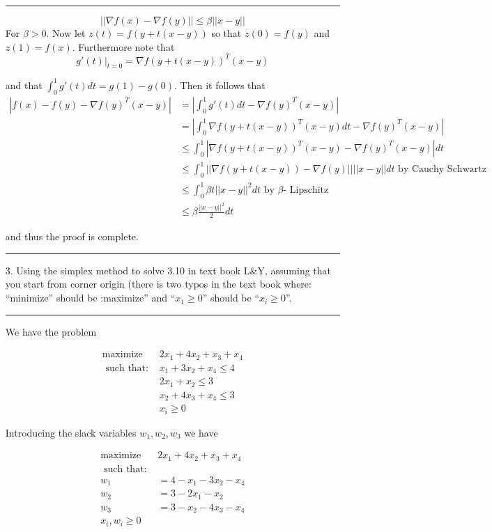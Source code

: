 \documentclass[12pt,letterpaper]{article}
\begin{document}
\begin{enumerate}
\rule{\textwidth}{1pt}
\[
|| \nabla f(x) - \nabla f(y) || \leq \beta ||x - y ||
\]
For $\beta > 0$. Now let $z(t) = f(y + t(x -y))$ so that $z(0) = f(y)$ and $z(1) = f(x)$. Furthermore note that
\[
g'(t)|_{t = 0 } = \nabla f(y + t(x - y))^{T} (x - y)
\]

and that $\int_{0}^{1} g'(t) dt = g(1) - g(0)$. Then it follows that 
\begin{equation*}
\begin{aligned}
|f(x) - f(y) - \nabla f(y)^T (x - y) | &= | \int_{0}^{1} g'(t) dt - \nabla f(y)^T (x -y)|   \\ 
&= | \int_{0}^{1} \nabla f(y + t(x - y))^T (x - y) dt - \nabla f(y)^T (x - y) | \\ 
&\leq \int_{0}^1 | \nabla f(y + t(x - y))^T (x - y) - \nabla f(y)^T (x - y) |dt  \\ 
&\leq \int_{0}^1 || \nabla f(y + t(x - y)) - \nabla f(y) || ||x - y|| dt   \mbox{    by Cauchy Schwartz } \\ 
&\leq \int_{0}^1 \beta t ||x - y||^2 dt   \mbox{    by $\beta$- Lipschitz } \\ 
&\leq  \beta  \frac{||x - y||^2}{2} dt  
\end{aligned}
\end{equation*}

and thus the proof is complete. 

\rule{\textwidth}{1pt}
\item[3.] Using the simplex method to solve 3.10 in text book L\&Y, assuming that you start from corner origin (there is two typos in
the text book where: ``minimize'' should be :maximize'' and ``$x_1\ge 0$'' should be ``$x_i\ge 0$''.


\rule{\textwidth}{1pt}


We have the problem 

\begin{equation*}
\begin{aligned}
\mbox{maximize } &2x_1 + 4x_2+ x_3 + x_4 \\ 
\mbox{ such that: } & x_1 + 3x_2 + x_4 \leq 4 \\ 
& 2x_1 + x_2 \leq 3 \\ 
& x_2 + 4x_3 + x_4 \leq 3 \\ 
& x_i \geq 0 
\end{aligned}
\end{equation*}

Introducing the slack variables $w_1,w_2, w_3$ we have

\begin{equation*}
\begin{aligned}
\mbox{maximize } &2x_1 + 4x_2+ x_3 + x_4 \\ 
\mbox{ such that: } & \\ 
w_1 &= 4 - x_1 - 3 x_2 - x_4 \\ 
w_2 &= 3 - 2x_1 - x_2 \\
w_3 &= 3 - x_2 - 4x_3 - x_4  \\ 
x_i, w_i \geq 0
\end{aligned}
\end{equation*}


\end{enumerate}
\end{document}
